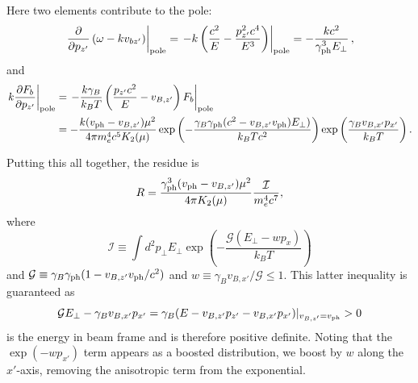 \documentclass[usenatbib,iop,apj]{emulateapj}
\def\gph{\gamma_{\rm ph}}
\def\vph{v_{\rm ph}}
\def\cG{\mathcal{G}}
\newcommand{\kI}{\ensuremath{\mathcal{I}}}
\begin{document}
Here two elements contribute to the pole:
\begin{equation}
\left.
\frac{\partial}{\partial p_{z'}} \left(\omega-k v_{bz'}\right)
\right|_{\rm pole}
=
\left.
- k \left(
  \frac{c^2}{E} - \frac{p_{z'}^2 c^4}{E^3}
\right)
\right|_{\rm pole}
=
- \frac{k c^2}{\gph^3 E_\perp}\,,
\end{equation}
and 
\begin{equation}
\begin{aligned}
\left.
k\frac{\partial F_b}{\partial p_{z'}}
\right|_{\rm pole}
&=
\left.
-\frac{k\gamma_B}{k_BT} \left( \frac{p_{z'} c^2}{E} - v_{B,z'}\right)
F_b
\right|_{\rm pole}\\
&=
-
\frac{
  k
  (\vph-v_{B,z'}) \mu^2}{
  4\pi m_e^{4}c^{5}K_2(\mu)
} \exp\left(-\frac {\gamma_B\gph(c^2 - v_{B,z'}v_{\rm ph})E_\perp)} {k_BT c^2}\right)\exp\left(\frac{\gamma_Bv_{B,x'} p_{x'}}{k_BT}\right).
\end{aligned}
\end{equation}


Putting this all together, the residue is
\begin{equation}
R
=
\frac{
  \gph^3 (\vph-v_{B,z'})\mu^2}{4\pi K_2(\mu)
}
\frac{\kI}{m_e^4c^7}
,
\label{eq:Rogen}
\end{equation}
where
\begin{equation}\label{eq:I-integral}
\kI \equiv \int d^2\!p_\perp E_\perp \exp\left(-\frac{\cG(E_\perp-w p_x)}{k_B T}\right)
\end{equation}
and $\cG\equiv\gamma_B\gph(1-v_{B,z'}\vph/c^2)$ and
$w\equiv \gamma_Bv_{B,x'}/\cG \le 1$.  This latter inequality is guaranteed as 
\begin{equation}
\cG E_\perp - \gamma_B v_{B,x'} p_{x'} = \gamma_B(E - v_{B,z'} p_{z'} - v_{B,x'}p_{x'})|_{v_{B,z'}=v_{\rm ph}} > 0
\end{equation}
is the energy in beam frame and is therefore positive definite.  Noting that the $\exp(-wp_{x'})$ term appears as a boosted distribution, we boost by $w$
along the $x'$-axis, removing the anisotropic term from the
exponential.  
\end{document}
